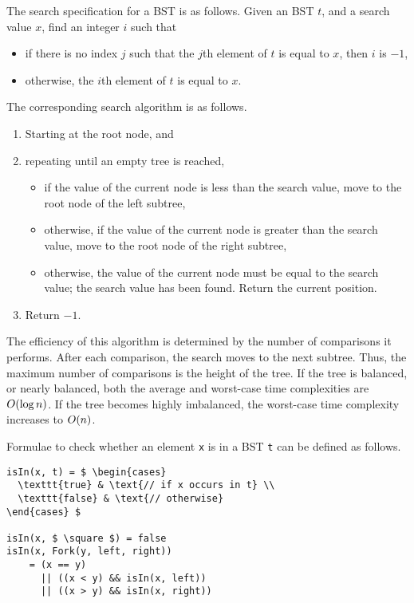 The search specification for a BST is as follows.
Given an BST \( t \), and a search value \( x \), find an integer \( i \) such that
\begin{itemize}
  \item if there is no index \( j \) such that the \( j \)th element of \( t \) is equal to \( x \), then \( i \) is \( -1 \),
  \item otherwise, the \( i \)th element of \( t \) is equal to \( x \).
\end{itemize}

The corresponding search algorithm is as follows.
\begin{enumerate}
  \item Starting at the root node, and
  \item repeating until an empty tree is reached,
  \begin{itemize}
    \item if the value of the current node is less than the search value, move to the root node of the left subtree,
    \item otherwise, if the value of the current node is greater than the search value, move to the root node of the right subtree,
    \item otherwise, the value of the current node must be equal to the search value; the search value has been found.
    Return the current position.
  \end{itemize}
  \item Return \( -1 \).
\end{enumerate}

The efficiency of this algorithm is determined by the number of comparisons it performs.
After each comparison, the search moves to the next subtree.
Thus, the maximum number of comparisons is the height of the tree.
If the tree is balanced, or nearly balanced, both the average and worst-case time complexities are \( O\!\left(\log n\right) \).
If the tree becomes highly imbalanced, the worst-case time complexity increases to \( O\!\left(n\right) \).

Formulae to check whether an element \texttt{x} is in a BST \texttt{t} can be defined as follows.
\begin{lstlisting}[mathescape=true]
isIn(x, t) = $ \begin{cases}
  \texttt{true} & \text{// if x occurs in t} \\
  \texttt{false} & \text{// otherwise}
\end{cases} $

isIn(x, $ \square $) = false
isIn(x, Fork(y, left, right))
    = (x == y)
      || ((x < y) && isIn(x, left))
      || ((x > y) && isIn(x, right))
\end{lstlisting}

